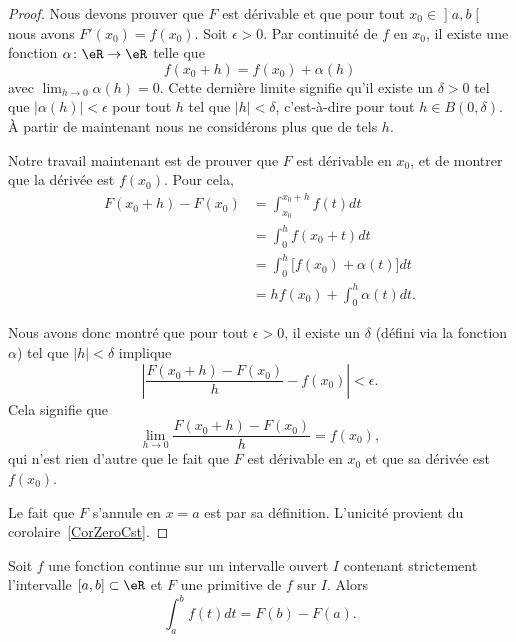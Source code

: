 \begin{proof}
Nous devons prouver que \( F\) est dérivable et que pour tout \( x_0\in\mathopen] a , b \mathclose[\) nous avons \( F'(x_0)=f(x_0)\). Soit \( \epsilon>0\). Par continuité de \( f\) en \( x_0\), il existe une fonction \( \alpha\colon \eR\to \eR\) telle que
    \begin{equation}
        f(x_0+h)=f(x_0)+\alpha(h)
    \end{equation}
    avec \( \lim_{h\to 0} \alpha(h)=0\). Cette dernière limite signifie qu'il existe un \( \delta>0\) tel que \( |\alpha(h)|<\epsilon\) pour tout \( h\) tel que \( | h |<\delta\), c'est-à-dire pour tout \( h\in B(0,\delta)\). À partir de maintenant nous ne considérons plus que de tels \( h\).

    Notre travail maintenant est de prouver que \( F\) est dérivable en \( x_0\), et de montrer que la dérivée est \( f(x_0)\). Pour cela,
    \begin{subequations}
        \begin{align}
            F(x_0+h)-F(x_0)&=\int_{x_0}^{x_0+h}f(t)dt\\
        &=\int_0^hf(x_0+t)dt\\
        &=\int_0^h\big[ f(x_0)+\alpha(t) \big]dt\\
        &=hf(x_0)+\int_0^{h}\alpha(t)dt.
        \end{align}
    \end{subequations}

    Nous avons donc montré que pour tout \( \epsilon>0\), il existe un \( \delta\) (défini via la fonction \( \alpha\)) tel que \( | h |<\delta\) implique
    \begin{equation}
        \left| \frac{ F(x_0+h)-F(x_0) }{ h }-f(x_0) \right| <\epsilon.
    \end{equation}
    Cela signifie que 
    \begin{equation}
        \lim_{h\to 0} \frac{ F(x_0+h)-F(x_0) }{ h }=f(x_0),
    \end{equation}
    qui n'est rien d'autre que le fait que \( F\) est dérivable en \( x_0\) et que sa dérivée est \( f(x_0)\).

    Le fait que \( F\) s'annule en \( x=a\) est par sa définition. L'unicité provient du corolaire~\ref{CorZeroCst}.
\end{proof}

\begin{theorem}    \label{ThoRWXooTqHGbC}
    Soit \( f\) une fonction continue sur un intervalle ouvert \( I\) contenant strictement l'intervalle \( \mathopen[ a , b \mathclose]\subset \eR\) et \( F\) une primitive de \( f\) sur \( I\). Alors
    \begin{equation}
        \int_a^bf(t)dt=F(b)-F(a).
    \end{equation}
\end{theorem}

